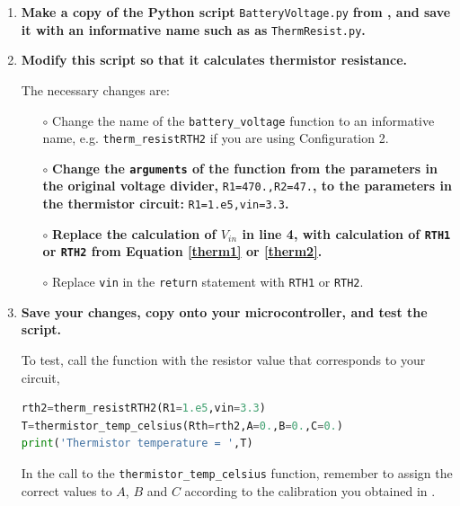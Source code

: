 \begin{enumerate}[resume]
	\item \textbf{Make a copy of the Python script }\lstinline{BatteryVoltage.py} \textbf{from , and save it with an informative name such as as }\lstinline{ThermResist.py}\textbf{.}
	
	\item \textbf{Modify this script so that it calculates thermistor resistance.}
	
	The necessary changes are:
	\begin{itemize}
		\item[$\circ$] Change the name of the \lstinline{battery_voltage} function to an informative name, e.g. \lstinline{therm_resistRTH2} if you are using Configuration 2. 
		
		\item[$\circ$] \textbf{Change the \texttt{arguments} of the function from the parameters in the original voltage divider,} \lstinline{R1=470.,R2=47.}\textbf{, to the parameters in the thermistor circuit:} \lstinline{R1=1.e5,vin=3.3}\textbf{.} 
		
		\item[$\circ$] \textbf{Replace the calculation of $V_{in}$ in line 4, with calculation of \texttt{RTH1} or \texttt{RTH2} from Equation \ref{therm1} or \ref{therm2}.}
	
		\item[$\circ$] Replace \texttt{vin} in the \texttt{return} statement with \texttt{RTH1} or \texttt{RTH2}.
	\end{itemize}
	
	\item \textbf{Save your changes, copy onto your microcontroller, and test the script.}

	To test, call the function with the resistor value that corresponds to your circuit,
\begin{lstlisting}[language=Python]
rth2=therm_resistRTH2(R1=1.e5,vin=3.3)
T=thermistor_temp_celsius(Rth=rth2,A=0.,B=0.,C=0.)
print('Thermistor temperature = ',T)
\end{lstlisting}	
	In the call to the \lstinline{thermistor_temp_celsius} function, remember to assign the correct values to $A$, $B$ and $C$ according to the calibration you obtained in .
	
	
\end{enumerate}

%



